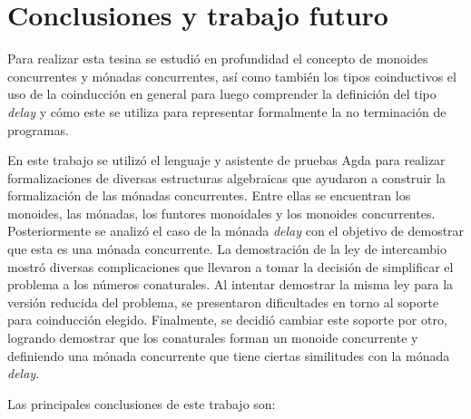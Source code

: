 \chapter{Conclusiones y trabajo futuro}

Para realizar esta tesina se estudió en profundidad el concepto de monoides concurrentes y mónadas concurrentes, así como también los tipos coinductivos el uso de la coinducción en general para luego comprender la definición del tipo \textit{delay} y cómo este se utiliza para representar formalmente la no terminación de programas. 

En este trabajo se utilizó el lenguaje y asistente de pruebas Agda para realizar formalizaciones de diversas estructuras algebraicas que ayudaron a construir la formalización de las mónadas concurrentes. Entre ellas se encuentran los monoides, las mónadas, los funtores monoidales y los monoides concurrentes. Posteriormente se analizó el caso de la mónada \textit{delay} con el objetivo de demostrar que esta es una mónada concurrente. La demostración de la ley de intercambio mostró diversas complicaciones que llevaron a tomar la decisión de simplificar el problema a los números conaturales. Al intentar demostrar la misma ley para la versión reducida del problema, se presentaron dificultades en torno al soporte para coinducción elegido. Finalmente, se decidió cambiar este soporte por otro, logrando demostrar que los conaturales forman un monoide concurrente y definiendo una mónada concurrente que tiene ciertas similitudes con la mónada \textit{delay}. 

Las principales conclusiones de este trabajo son: 

